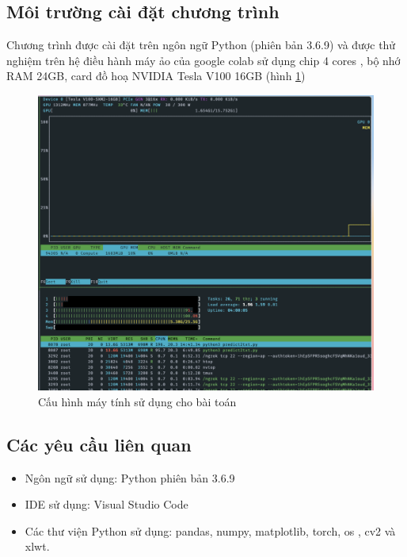\documentclass[a4paper, 12pt]{report}
\begin{document}
\subsection{Môi trường cài đặt chương trình}
Chương trình được cài đặt trên ngôn ngữ Python (phiên bản 3.6.9) và được thử nghiệm trên hệ điều hành máy ảo của google colab sử dụng chip 4 cores , bộ nhớ RAM 24GB,  card đồ hoạ NVIDIA Tesla V100 16GB (hình \ref{fig:nvidia-smi})
 \begin{figure}[!h]
	\centering
	\includegraphics[width=0.8\linewidth]{Images/nvidia-smi}
	\caption{Cấu hình máy tính sử dụng cho bài toán}
	\label{fig:nvidia-smi}
\end{figure}
\subsection{Các yêu cầu liên quan}
\begin{itemize}
	\item Ngôn ngữ sử dụng: Python phiên bản 3.6.9
	\item IDE sử dụng: Visual Studio Code
	\item Các thư viện Python sử dụng: pandas, numpy, matplotlib,  torch, os , cv2 và xlwt.
\end{itemize}
\end{document}
